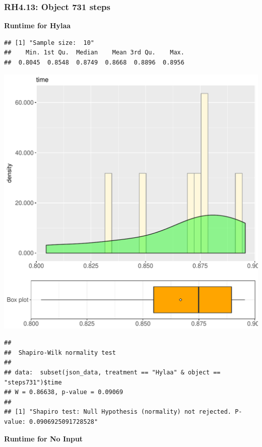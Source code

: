 \documentclass{article}\usepackage[]{graphicx}\usepackage[]{color}
\makeatletter
\def\maxwidth{ %
  \ifdim\Gin@nat@width>\linewidth
    \linewidth
  \else
    \Gin@nat@width
  \fi
}
\newenvironment{kframe}{%
 \def\at@end@of@kframe{}%
 \ifinner\ifhmode%
  \def\at@end@of@kframe{\end{minipage}}%
  \begin{minipage}{\columnwidth}%
 \fi\fi%
 \def\FrameCommand##1{\hskip\@totalleftmargin \hskip-\fboxsep
 \colorbox{shadecolor}{##1}\hskip-\fboxsep
     \hskip-\linewidth \hskip-\@totalleftmargin \hskip\columnwidth}%
 \MakeFramed {\advance\hsize-\width
   \@totalleftmargin\z@ \linewidth\hsize
   \@setminipage}}%
 {\par\unskip\endMakeFramed%
 \at@end@of@kframe}
\newenvironment{knitrout}{}{} %
\makeatother
\begin{document}
\subsubsection{RH4.13: Object 731 steps}

 \textbf{Runtime for Hylaa}
\begin{knitrout}
\color{fgcolor}\begin{kframe}
\begin{verbatim}
## [1] "Sample size:  10"
##    Min. 1st Qu.  Median    Mean 3rd Qu.    Max. 
##  0.8045  0.8548  0.8749  0.8668  0.8896  0.8956
\end{verbatim}
\end{kframe}
\includegraphics[width=\maxwidth]{figure/RH4_Hylaa_steps731-1} 
\begin{kframe}\begin{verbatim}
## 
## 	Shapiro-Wilk normality test
## 
## data:  subset(json_data, treatment == "Hylaa" & object == "steps731")$time
## W = 0.86638, p-value = 0.09069
## 
## [1] "Shapiro test: Null Hypothesis (normality) not rejected. P-value: 0.0906925091728528"
\end{verbatim}
\end{kframe}
\end{knitrout}
 \textbf{Runtime for No Input}
\end{document}
